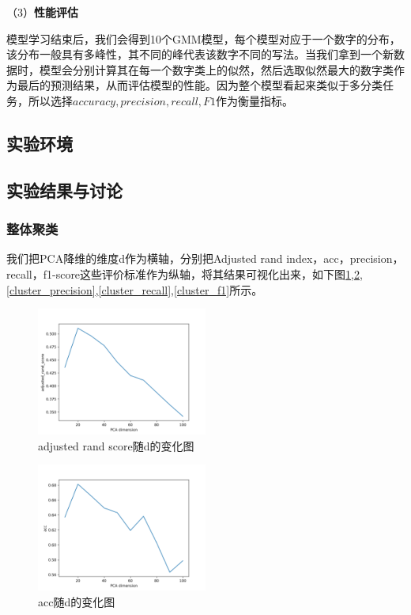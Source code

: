 \documentclass[UTF8]{ctexart}
\begin{document}
（3）\textbf{性能评估}

模型学习结束后，我们会得到10个GMM模型，每个模型对应于一个数字的分布，该分布一般具有多峰性，其不同的峰代表该数字不同的写法。当我们拿到一个新数据时，模型会分别计算其在每一个数字类上的似然，然后选取似然最大的数字类作为最后的预测结果，从而评估模型的性能。因为整个模型看起来类似于多分类任务，所以选择$accuracy, precision, recall, F1$作为衡量指标。

\subsection{实验环境}

\subsection{实验结果与讨论}

\subsubsection{整体聚类}

我们把PCA降维的维度d作为横轴，分别把Adjusted rand index，acc，precision，recall，f1-score这些评价标准作为纵轴，将其结果可视化出来，如下图\ref{cluster_adjusted_rand_score},\ref{cluster_acc},\ref{cluster_precision},\ref{cluster_recall},\ref{cluster_f1}所示。

\begin{figure}[!h]
  \includegraphics[width=0.5\textwidth]{./figures/cluster_adjusted_rand_score.png}
  \centering
  \caption{adjusted rand score随d的变化图}
  \label{cluster_adjusted_rand_score}
\end{figure}


\begin{figure}[!h]
  \includegraphics[width=0.5\textwidth]{./figures/cluster_acc.png}
  \centering
  \caption{acc随d的变化图}
  \label{cluster_acc}
\end{figure}
\end{document}
